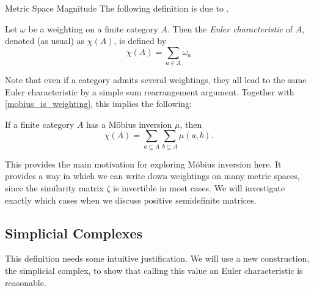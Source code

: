 \documentclass[12pt]{pom_thesis}
\begin{document}
\begin{chapter}{Metric Space Magnitude}
The following definition is due to \cite{Lein1}.
\begin{defn}
Let $\omega$ be a weighting on a finite category $A$. Then the \emph{Euler characteristic} of $A$, denoted (as usual) as $\chi(A)$, is defined by
\[
\chi(A) = \sum_{a \in A} \omega_a
\]
\end{defn}
Note that even if a category admits several weightings, they all lead to the same Euler characteristic by a simple sum rearrangement argument. Together with \ref{mobius_is_weighting}, this implies the following:
\begin{cor}
If a finite category $A$ has a M\"obius inversion $\mu$, then
\[\chi(A) = \sum_{a \subseteq A} \sum_{b \subseteq A} \mu(a, b).
\]
\end{cor}
This provides the main motivation for exploring M\"obius inversion here. It provides a way in which we can write down weightings on many metric spaces, since the similarity matrix $\zeta$ is invertible in most cases. We will investigate exactly which cases when we discuss positive semidefinite matrices.
\subsection{Simplicial Complexes}
This definition needs some intuitive justification. We will use a new construction, the simplicial complex, to show that calling this value an Euler characteristic is reasonable.


\end{chapter}
\end{document}
